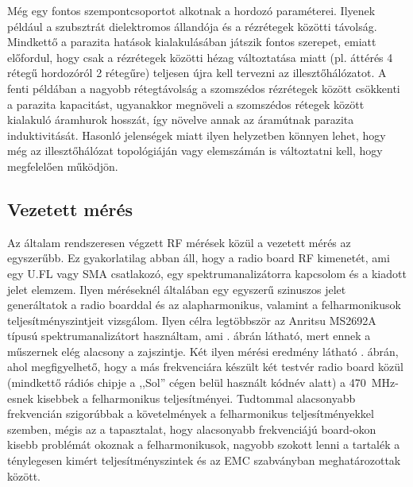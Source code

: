 \documentclass[a4paper,12pt,titlepage]{article}
\begin{document}
        \par
        Még egy fontos szempontcsoportot alkotnak a hordozó paraméterei. Ilyenek például a szubsztrát dielektromos állandója és a rézrétegek közötti távolság. Mindkettő a parazita hatások kialakulásában játszik fontos szerepet, emiatt előfordul, hogy csak a rézrétegek közötti hézag változtatása miatt (pl. áttérés 4 rétegű hordozóról 2 rétegűre) teljesen újra kell tervezni az illesztőhálózatot. A fenti példában a nagyobb rétegtávolság a szomszédos rézrétegek között csökkenti a parazita kapacitást, ugyanakkor megnöveli a szomszédos rétegek között kialakuló áramhurok hosszát, így növelve annak az áramútnak parazita induktivitását. Hasonló jelenségek miatt ilyen helyzetben könnyen lehet, hogy még az illesztőhálózat topológiáján vagy elemszámán is változtatni kell, hogy megfelelően működjön.
        \subsection{Vezetett mérés}
            Az általam rendszeresen végzett RF mérések közül a vezetett mérés az egyszerűbb. Ez gyakorlatilag abban áll, hogy a radio board RF kimenetét, ami egy U.FL vagy SMA csatlakozó, egy spektrumanalizátorra kapcsolom és a kiadott jelet elemzem. Ilyen méréseknél általában egy egyszerű szinuszos jelet generáltatok a radio boarddal és az alapharmonikus, valamint a felharmonikusok teljesítményszintjeit vizsgálom. Ilyen célra legtöbbször az Anritsu MS2692A típusú spektrumanalizátort használtam, ami . ábrán látható, mert ennek a műszernek elég alacsony a zajszintje. Két ilyen mérési eredmény látható . ábrán, ahol megfigyelhető, hogy a más frekvenciára készült két testvér radio board közül (mindkettő rádiós chipje a ,,Sol'' cégen belül használt kódnév alatt) a \SI{470}{MHz}-esnek kisebbek a felharmonikus teljesítményei. Tudtommal alacsonyabb frekvencián szigorúbbak a követelmények a felharmonikus teljesítményekkel szemben, mégis az a tapasztalat, hogy alacsonyabb frekvenciájú board-okon kisebb problémát okoznak a felharmonikusok, nagyobb szokott lenni a tartalék a ténylegesen kimért teljesítményszintek és az EMC szabványban meghatározottak között.
            \par
\end{document}
